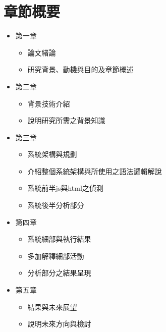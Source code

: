 \section{章節概要} 
\begin{itemize}
	\item 第一章
		\begin{itemize}
			\item 論文緒論
			\item 研究背景、動機與目的及章節概述
		\end{itemize}
	\item 第二章
		\begin{itemize}
			\item 背景技術介紹
			\item 說明研究所需之背景知識
		\end{itemize}
	\item 第三章
		\begin{itemize}
			\item 系統架構與規劃
			\item 介紹整個系統架構與所使用之語法邏輯解說
			\item 系統前半js與html之偵測
			\item 系統後半分析部分
		\end{itemize}
	\item 第四章
		\begin{itemize}
			\item 系統細部與執行結果
			\item 多加解釋細部活動
			\item 分析部分之結果呈現
	\end{itemize}
	\item 第五章
		\begin{itemize}
			\item 結果與未來展望
			\item 說明未來方向與檢討
		\end{itemize}
\end{itemize}